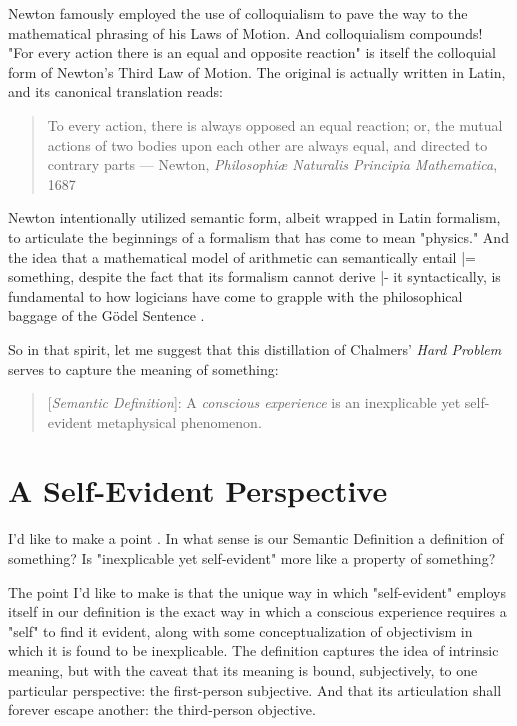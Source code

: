\documentclass[runningheads]{llncs}
\begin{document}
Newton famously employed the use of colloquialism to pave the way to the mathematical phrasing of his Laws of Motion. And colloquialism compounds! "For every action there is an equal and opposite reaction" is itself the colloquial form of Newton's Third Law of Motion. The original is actually written in Latin, and its canonical translation reads:

\begin{quote}
To every action, there is always opposed an equal reaction; or, the mutual actions of two bodies upon each other are always equal, and directed to contrary parts --- Newton, \emph{Philosophiæ Naturalis Principia Mathematica}, 1687
\end{quote}

Newton intentionally utilized semantic form, albeit wrapped in Latin formalism, to articulate the beginnings of a formalism that has come to mean "physics." And the idea that a mathematical model of arithmetic can semantically entail |= something, despite the fact that its formalism cannot derive |- it syntactically, is fundamental to how logicians have come to grapple with the philosophical baggage of the Gödel Sentence \cite{Smullyan1992} \cite{Tarski1935}.

So in that spirit, let me suggest that this distillation of Chalmers' \emph{Hard Problem} serves to capture the meaning of something:

\begin{quote}
[\emph{Semantic Definition}]: A \emph{conscious experience} is an inexplicable yet self-evident metaphysical phenomenon.
\end{quote}

\section{A Self-Evident Perspective}

I'd like to make a point \cite{Reference}. In what sense is our Semantic Definition a definition of something? Is "inexplicable yet self-evident" more like a property of something?

The point I'd like to make \cite{Reference2} is that the unique way in which "self-evident" employs itself in our definition is the exact way in which a conscious experience requires a "self" to find it evident, along with some conceptualization of objectivism in which it is found to be inexplicable. The definition captures the idea of intrinsic meaning, but with the caveat that its meaning is bound, subjectively, to one particular perspective: the first-person subjective. And that its articulation shall forever escape another: the third-person objective.
\end{document}
